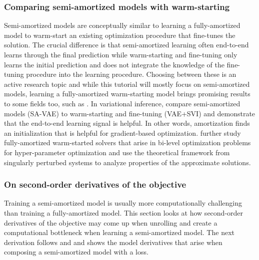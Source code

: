 \subsubsection{Comparing semi-amortized models with warm-starting}
Semi-amortized models are conceptually similar to learning a fully-amortized model
to warm-start an existing optimization procedure that fine-tunes the solution.
The crucial difference is that semi-amortized learning often end-to-end learns
through the final prediction while warm-starting and fine-tuning only learns
the initial prediction and does not integrate the knowledge of the fine-tuning
procedure into the learning procedure.
Choosing between these is an active research topic and while this
tutorial will
mostly focus on semi-amortized models, learning a fully-amortized
warm-starting model brings promising results to some fields too,
such as \citet{zhang2019safe,baker2019learning,chen2022large}.
In variational inference, \citet[Table 2]{kim2018semi} compare semi-amortized
models (SA-VAE) to warm-starting and fine-tuning (VAE+SVI) and demonstrate
that the end-to-end learning signal is helpful.
In other words, amortization finds an initialization that is
helpful for gradient-based optimization.
\citet{arbel2021amortized} further study fully-amortized warm-started
solvers that arise in bi-level optimization problems for
hyper-parameter optimization and use the theoretical framework from
singularly perturbed systems \citep{habets2010stabilite}
to analyze properties of the approximate solutions.

\subsubsection{On second-order derivatives of the objective}
\label{sec:second-derivatives}

Training a semi-amortized model is usually more computationally
challenging than training a fully-amortized model.
This section looks at how second-order derivatives of the
objective may come up when unrolling and create a
computational bottleneck when learning a semi-amortized model.
The next derivation follows \citet[\S5]{nichol2018first}
and \citet{weng2018metalearning} and shows the model derivatives
that arise when composing a semi-amortized model with a loss.


